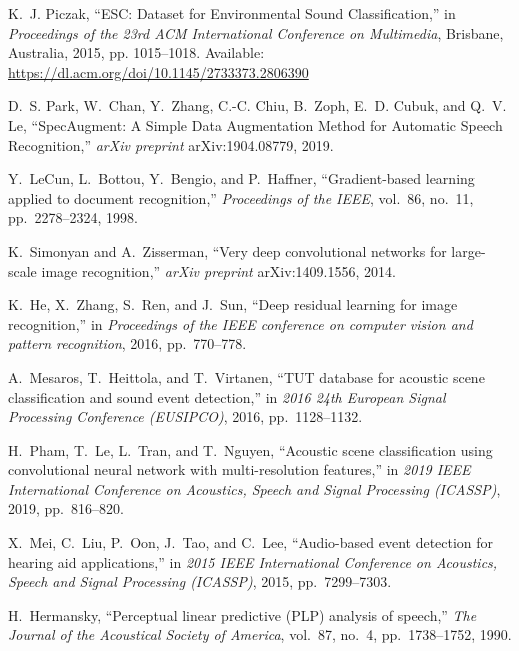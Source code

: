 \documentclass[conference]{IEEEtran}
\begin{document}
\begin{thebibliography}{00}

K.~J. Piczak, ``ESC: Dataset for Environmental Sound Classification,''
in \emph{Proceedings of the 23rd ACM International Conference on Multimedia},
Brisbane, Australia, 2015, pp. 1015--1018. Available: \url{https://dl.acm.org/doi/10.1145/2733373.2806390}

D.~S. Park, W.~Chan, Y.~Zhang, C.-C. Chiu, B.~Zoph, E.~D. Cubuk, and Q.~V. Le,
``SpecAugment: A Simple Data Augmentation Method for Automatic Speech Recognition,''
\emph{arXiv preprint} arXiv:1904.08779, 2019.

Y.~LeCun, L.~Bottou, Y.~Bengio, and P.~Haffner,
``Gradient-based learning applied to document recognition,''
\emph{Proceedings of the IEEE}, vol.~86, no.~11, pp.~2278--2324, 1998.

K.~Simonyan and A.~Zisserman,
``Very deep convolutional networks for large-scale image recognition,''
\emph{arXiv preprint} arXiv:1409.1556, 2014.

K.~He, X.~Zhang, S.~Ren, and J.~Sun,
``Deep residual learning for image recognition,''
in \emph{Proceedings of the IEEE conference on computer vision and pattern recognition}, 2016, pp.~770--778.

A.~Mesaros, T.~Heittola, and T.~Virtanen,
``TUT database for acoustic scene classification and sound event detection,''
in \emph{2016 24th European Signal Processing Conference (EUSIPCO)}, 2016, pp.~1128--1132.

H.~Pham, T.~Le, L.~Tran, and T.~Nguyen,
``Acoustic scene classification using convolutional neural network with multi-resolution features,''
in \emph{2019 IEEE International Conference on Acoustics, Speech and Signal Processing (ICASSP)}, 2019, pp.~816--820.

X.~Mei, C.~Liu, P.~Oon, J.~Tao, and C.~Lee,
``Audio-based event detection for hearing aid applications,''
in \emph{2015 IEEE International Conference on Acoustics, Speech and Signal Processing (ICASSP)}, 2015, pp.~7299--7303.

H.~Hermansky,
``Perceptual linear predictive (PLP) analysis of speech,''
\emph{The Journal of the Acoustical Society of America}, vol.~87, no.~4, pp.~1738--1752, 1990.


\end{thebibliography}
\end{document}
